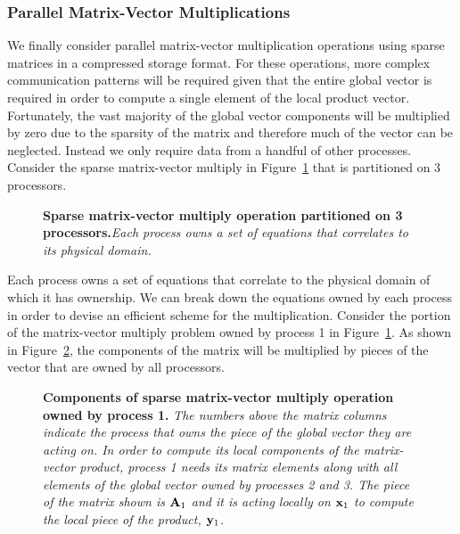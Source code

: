 \subsubsection{Parallel Matrix-Vector Multiplications}
\label{subsubsec:parallel_mat_vec_mutliply}
We finally consider parallel matrix-vector multiplication operations
using sparse matrices in a compressed storage format. For these
operations, more complex communication patterns will be required given
that the entire global vector is required in order to compute a single
element of the local product vector. Fortunately, the vast majority of
the global vector components will be multiplied by zero due to the
sparsity of the matrix and therefore much of the vector can be
neglected. Instead we only require data from a handful of other
processes. Consider the sparse matrix-vector multiply in
Figure~\ref{fig:partitioned_matvec_multiply} that is partitioned on 3
processors.
\begin{figure}[htpb!]
  \begin{center}
    \scalebox{1.5}{
       }
  \end{center}
  \caption{\textbf{Sparse matrix-vector multiply operation partitioned
      on 3 processors.}\textit{Each process owns a set of equations
      that correlates to its physical domain.}}
  \label{fig:partitioned_matvec_multiply}
\end{figure}
Each process owns a set of equations that correlate to the physical
domain of which it has ownership. We can break down the equations
owned by each process in order to devise an efficient scheme for the
multiplication. Consider the portion of the matrix-vector multiply
problem owned by process 1 in
Figure~\ref{fig:partitioned_matvec_multiply}. As shown in
Figure~\ref{fig:matvec_proc_1}, the components of the matrix will be
multiplied by pieces of the vector that are owned by all
processors. 
\begin{figure}[htpb!]
  \begin{center}
    \scalebox{1.5}{
       }
  \end{center}
  \caption{\textbf{Components of sparse matrix-vector multiply
      operation owned by process 1.} \textit{The numbers above the
      matrix columns indicate the process that owns the piece of the
      global vector they are acting on. In order to compute its local
      components of the matrix-vector product, process 1 needs its
      matrix elements along with all elements of the global vector
      owned by processes 2 and 3. The piece of the matrix shown is
      $\mathbf{A}_1$ and it is acting locally on $\mathbf{x}_1$ to compute the
      local piece of the product, $\mathbf{y}_1$.}}
  \label{fig:matvec_proc_1}
\end{figure}
